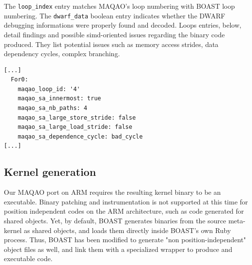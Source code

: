 \documentclass[11pt, a4paper, twoside]{montblanc2}
\begin{document}
The \verb|loop_index| entry matches MAQAO's loop numbering with BOAST loop
numbering. The \verb|dwarf_data| boolean entry indicates whether the DWARF
debugging informations were properly found and decoded. Loops entries, below, detail
findings and possible simd-oriented issues regarding the binary code produced.
They list potential issues such as memory access strides, data dependency
cycles, complex branching.

\begin{verbatim}
[...]
  For0:
    maqao_loop_id: '4'
    maqao_sa_innermost: true
    maqao_sa_nb_paths: 4
    maqao_sa_large_store_stride: false
    maqao_sa_large_load_stride: false
    maqao_sa_dependence_cycle: bad_cycle
[...]
\end{verbatim}

\subsection{Kernel generation}


Our MAQAO port on ARM requires the resulting kernel binary to be an executable.
Binary patching and instrumentation is not supported at this time for position
independent codes on the ARM architecture, such as code generated for shared
objects. Yet, by default, BOAST generates binaries from the source meta-kernel
as shared objects, and loads them directly inside BOAST's own Ruby process.
Thus, BOAST has been modified to generate "non position-independent" object
files as well, and link them with a specialized wrapper to produce and
executable code.
\end{document}
